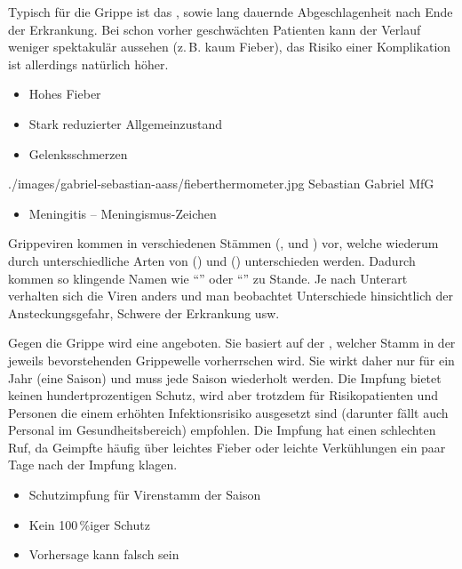 \TextSlideTeaser
{\TxSymptome}%
{%
Typisch für die Grippe ist das , sowie lang dauernde
Abgeschlagenheit nach Ende der Erkrankung. Bei schon vorher
geschwächten Patienten kann der Verlauf weniger spektakulär
aussehen (z.\,B. kaum Fieber), das Risiko einer
Komplikation ist allerdings natürlich höher.}%
{
\begin{itemize}
  \item Hohes Fieber
  \item Stark reduzierter Allgemeinzustand
  \item Gelenksschmerzen
\end{itemize}}%
{./images/gabriel-sebastian-aass/fieberthermometer.jpg}%
{}%
{}%
{Sebastian Gabriel}%
{MfG}%

{
\begin{itemize}
  \item Meningitis -- Meningismus-Zeichen
\end{itemize}
}{}{}{}

{
Grippeviren kommen in verschiedenen
Stämmen (,  und ) vor, welche
wiederum durch unterschiedliche Arten von
 () und 
() unterschieden werden. Dadurch kommen so
klingende Namen wie \enquote{} oder
\enquote{} zu Stande. Je nach Unterart verhalten
sich die Viren anders und man beobachtet Unterschiede
hinsichtlich der Ansteckungsgefahr, Schwere der Erkrankung
usw.
\Z{}
}
{

}
{}
{}
{}

{%
Gegen die Grippe wird eine  angeboten. Sie
basiert auf der , welcher Stamm in der jeweils
bevorstehenden Grippewelle vorherrschen wird. Sie wirkt
daher nur für ein Jahr (eine Saison) und muss jede Saison
wiederholt werden. Die Impfung bietet keinen
hundertprozentigen Schutz, wird aber trotzdem für
Risikopatienten und Personen die einem erhöhten
Infektionsrisiko ausgesetzt sind (darunter fällt auch
Personal im Gesundheitsbereich) empfohlen. Die Impfung hat
einen schlechten Ruf, da Geimpfte häufig über leichtes
Fieber oder leichte Verkühlungen ein paar Tage nach der
Impfung klagen.
}{
\begin{itemize}
  \item Schutzimpfung für  Virenstamm der Saison
  \item Kein 100\,\%iger Schutz
  \item Vorhersage kann falsch sein
\end{itemize}
}
{}
{}
{}

